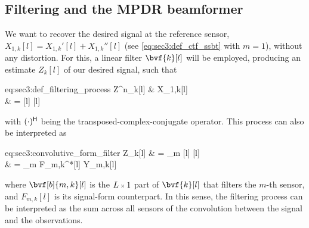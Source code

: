 
\subsection{Filtering and the MPDR beamformer}

We want to recover the desired signal at the reference sensor, $X_{1,k}[l] = X_{1,k}'[l] + X_{1,k}''[l]$ (see \cref{eq:sec3:def_ctf_ssbt} with $m=1$), without any distortion. For this, a linear filter $\bvf{k}[l]$ will be employed, producing an estimate $Z_{k}[l]$ of our desired signal, such that
\begin{equations}{eq:sec3:def_filtering_process}
	Z^n_{k}[l]
	& \approx X_{1,k}[l] \\
	& =  
\end{equations}
with $\he{(\cdot)}$ being the transposed-complex-conjugate operator. This process can also be interpreted as
\begin{equations}{eq:sec3:convolutive_form_filter}
	Z_{k}[l]
	& = \sum_{m}   \\
	& = \sum_{m} F_{m,k}^*[l] \ast Y_{m,k}[l]
\end{equations}
where $\bvf[b]{m,k}[l]$ is the $\sz{L}{1}$ part of $\bvf{k}[l]$ that filters the $m$-th sensor, and $F_{m,k}[l]$ is its signal-form counterpart. In this sense, the filtering process can be interpreted as the sum across all sensors of the convolution between the signal and the observations.

